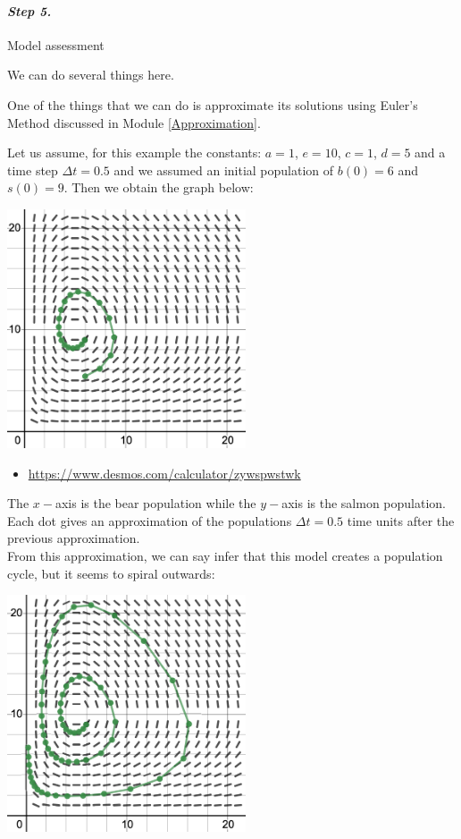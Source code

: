\paragraph{\emph{Step 5.}} Model assessment

\begin{example}

We can do several things here. 

One of the things that we can do is approximate its solutions using Euler's Method discussed in Module \ref{Approximation}. 

Let us assume, for this example the constants: $a=1$, $e=10$, $c=1$, $d=5$ and a time step $\Delta t = 0.5$ and we assumed an initial population of $b(0)=6$ and $s(0)=9$. Then we obtain the graph below:


\begin{center}
\includegraphics*[width=200pt]{images/module16-lotka-volterra.png}
\end{center}
\begin{itemize}
	\item \url{https://www.desmos.com/calculator/zywspwstwk} \hfill {}
\end{itemize}

The $x-$axis is the bear population while the $y-$axis is the salmon population. Each dot gives an approximation of the populations $\Delta t = 0.5$ time units after the previous approximation.\\


From this approximation, we can say infer that this model creates a population cycle, but it seems to spiral outwards: 
\begin{center}
\includegraphics*[width=200pt]{images/module16-lotka-volterra-more.png}
\end{center}


\end{example}
